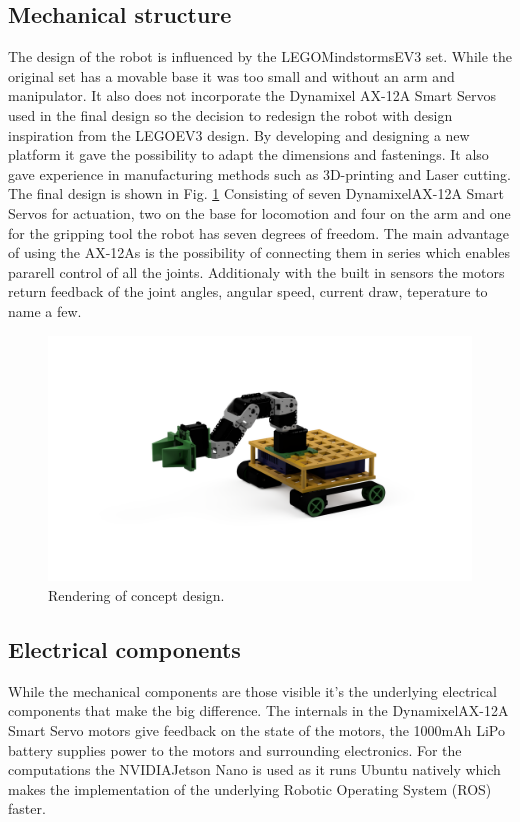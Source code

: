 
\subsection{Mechanical structure}
The design of the robot is influenced by the LEGO\textregistered Mindstorms\textregistered EV3 set. While the original set has a movable base it was too small and without an arm and manipulator. It also does not incorporate the Dynamixel AX-12A Smart Servos used in the final design so the decision to redesign the robot with design inspiration from the LEGO\textregistered EV3 design. By developing and designing a new platform it gave the possibility to adapt the dimensions and fastenings. It also gave experience in manufacturing methods such as 3D-printing and Laser cutting. The final design is shown in Fig. \ref{fig:concept_rendering}
Consisting of seven Dynamixel\textregistered AX-12A Smart Servos for actuation, two on the base for locomotion and four on the arm and one for the gripping tool the robot has seven degrees of freedom. The main advantage of using the AX-12As is the possibility of connecting them in series which enables pararell control of all the joints. Additionaly with the built in sensors the motors return feedback of the joint angles, angular speed, current draw, teperature to name a few.  

\begin{figure}
    \centering
    \includegraphics[width=0.7\columnwidth]{chapters/img/rendering.png}
    \caption{Rendering of concept design.}
    \label{fig:concept_rendering}
\end{figure}

\subsection{Electrical components}
While the mechanical components are those visible it's the underlying electrical components that make the big difference. The internals in the Dynamixel\textregistered AX-12A Smart Servo motors give feedback on the state of the motors, the 1000mAh LiPo battery supplies power to the motors and surrounding electronics. For the computations the NVIDIA\textregistered Jetson Nano is used as it runs Ubuntu natively which makes the implementation of the underlying Robotic Operating System (ROS) \cite{ros} faster. 


